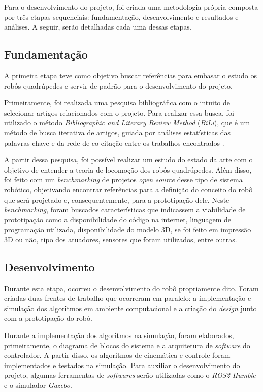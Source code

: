 \documentclass[../main.tex]{subfiles}
\begin{document}
  Para o desenvolvimento do projeto, foi criada uma metodologia própria composta por três etapas sequenciais: fundamentação, desenvolvimento e resultados e análises. A seguir, serão detalhadas cada uma dessas etapas.

  \subsection{Fundamentação}
  A primeira etapa teve como objetivo buscar referências para embasar o estudo os robôs quadrúpedes e servir de padrão para o desenvolvimento do projeto.

  Primeiramente, foi realizada uma pesquisa bibliográfica com o intuito de selecionar artigos relacionados com o projeto. Para realizar essa busca, foi utilizado o método \textit{Bibliographic and Literary Review Method} (\textit{BiLi}), que é um método de busca iterativa de artigos, guiada por análises estatísticas das palavras-chave e da rede de co-citação entre os trabalhos encontrados \cite{bili}.

  A partir dessa pesquisa, foi possível realizar um estudo do estado da arte com o objetivo de entender a teoria de locomoção dos robôs quadrúpedes. Além disso, foi feito com um \textit{benchmarking} de projetos \textit{open source} desse tipo de sistema robótico, objetivando encontrar referências para a definição do conceito do robô que será projetado e, consequentemente, para a prototipação dele. Neste \textit{benchmarking}, foram buscados características que indicassem a viabilidade de prototipação como a disponibilidade do código na internet, linguagem de programação utilizada, disponibilidade do modelo 3D, se foi feito em impressão 3D ou não, tipo dos atuadores, sensores que foram utilizados, entre outras.

  \subsection{Desenvolvimento}
  Durante esta etapa, ocorreu o desenvolvimento do robô propriamente dito. Foram criadas duas frentes de trabalho que ocorreram em paralelo: a implementação e simulação dos algoritmos em ambiente computacional e a criação do \textit{design} junto com a prototipação do robô.

  Durante a implementação dos algoritmos na simulação, foram elaborados, primeiramente, o diagrama de blocos do sistema e a arquitetura de \textit{software} do controlador. A partir disso, os algoritmos de cinemática e controle foram implementados e testados na simulação. Para auxiliar o desenvolvimento do projeto, algumas ferramentas de \textit{softwares} serão utilizadas como o \textit{ROS2 Humble} e o simulador \textit{Gazebo}.
\end{document}
